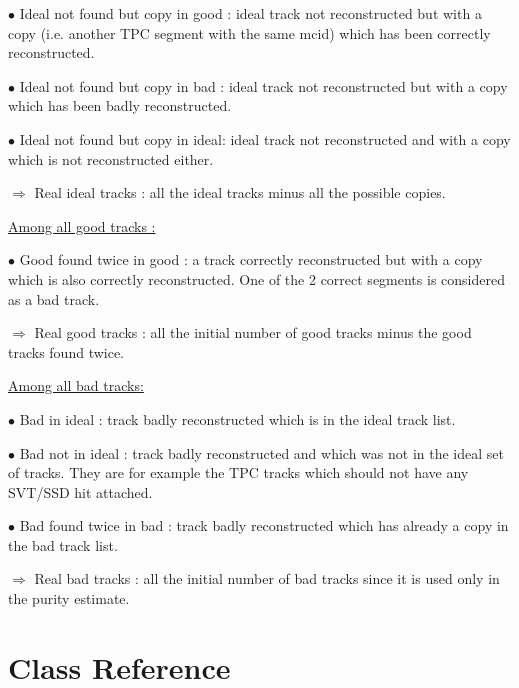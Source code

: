 \documentclass[twoside]{article}
\begin{document}
$\bullet$ Ideal not found but copy in good : ideal track not reconstructed 
but with a copy (i.e. another TPC segment with the same mcid) which
has been correctly reconstructed.  

$\bullet$ Ideal not found but copy in bad : ideal track not reconstructed 
but with a copy which has been badly reconstructed.   

$\bullet$ Ideal not found but copy in ideal: ideal track not reconstructed and 
with a copy which is not reconstructed either.

$\Longrightarrow$ Real ideal tracks : all the ideal tracks minus all the 
possible copies. 

\vspace*{0.3cm}
\underline{Among all good tracks : }

$\bullet$ Good found twice in good : a track correctly reconstructed
but with a copy which is also correctly reconstructed. One of the 2
correct segments is considered as a bad track.

$\Longrightarrow$ Real good tracks : all the initial number of good tracks minus the
good tracks found twice.



\vspace*{0.3cm}
\underline{Among all bad tracks: }

$\bullet$ Bad in ideal : track badly reconstructed which is in the ideal track list.

$\bullet$ Bad not in ideal : track badly reconstructed and which was
not in the ideal set of tracks. They are for example the TPC tracks
which should not have any SVT/SSD hit attached.

$\bullet$ Bad found twice in bad : track badly reconstructed which has
already a copy in the bad track list.

$\Longrightarrow$ Real bad tracks : all the initial number of bad
tracks since it is used only in the purity estimate.

\section{Class Reference}

%
%
\end{document}
